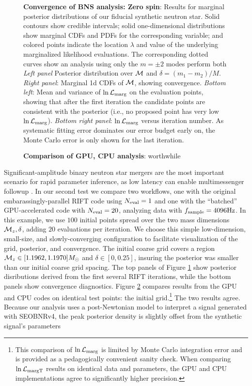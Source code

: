 \documentclass[twocolumn,prd,nofootinbib]{revtex4}
\newcommand\unit[1]{{\rm #1}}
\newcommand\editremark[1]{{\color{red} #1}}
\newcommand{\mc}{{\cal M}}
\begin{document}
\begin{figure}
\caption{\label{fig:BNS:MultiIterate}\textbf{Convergence of BNS analysis: Zero spin}: Results for marginal posterior distributions
  of our fiducial synthetic neutron star.  Solid contours show credible intervals; solid one-dimensional distributions
  show marginal CDFs and PDFs for the corresponding variable; and colored points indicate the location $\lambda$ and
  value of the underlying marginalized likelihood evaluations.   The corresponding dotted curves show an analysis using
  only the $m=\pm 2$ modes \editremark{perform both} \emph{Left panel } Posterior distribution
  over  $\mc$ and
  $\delta=(m_1-m_2)/M$.    \emph{Right panel}: Marginal 1d CDFs of $\mc$, showing convergence.
\emph{Bottom left}: Mean and variance of  $\ln{\cal L}_{\rm marg}$ on the evaluation points,  showing that after the
first iteration the
candidate points are consistent with the posterior (i.e., no proposed point has very low $\ln {\cal L}_{\rm marg}$).
\emph{Bottom right panel}: $\ln {\cal L}_{\rm marg}$ versus iteration number.  As systematic fitting error dominates our
error budget early on, the Monte Carlo error is only shown for the last iteration.
}
\end{figure}

\begin{figure}
\caption{\label{fig:BNS:Comparison}\textbf{Comparison of GPU, CPU analysis}: \editremark{worthwhile}
}
\end{figure}


Significant-amplitude  binary neutron star mergers are the most important scenario for rapid parameter inference, as low
latency can enable multimessenger followup  \cite{LIGO-O2-Catalog}.    
% 
In our second test we compare two workflows, one with the original embarassingly-parallel RIFT code using $N_{\rm
  eval}=1$ and one with the
``batched'' GPU-accelerated code with $N_{\rm eval}=20$, analyzing data with $f_{\rm sample}=4096\unit{Hz}$.    
In this example, we use $100$ initial points spread over the two mass dimensions $\mc_z,\delta$, adding $20$ evaluations per
iteration.   We
choose this simple low-dimension, small-size, and slowly-converging configuration to facilitate visualization of the grid, posterior, and convergence.     The initial coarse grid covers a region $\mc_z\in[1.1962,1.1970] M_\odot$ and $\delta \in [0,0.25]$,  insuring the posterior was smaller than our initial
coarse grid spacing.     The top  panels of Figure  \ref{fig:BNS:MultiIterate} show posterior disributions derived
from the first several RIFT iterations, while the bottom panels show convergence diagnostics.
Figure \ref{fig:BNS:Comparison} compares results from the GPU and CPU codes on \editremark{identical test points: the
  initial grid}.\footnote{This comparison of $\ln {\cal L}_{\rm marg}$ is limited by Monte Carlo integration error and
  is provided  as a pedagogically convenient sanity check.  When comparing 
  $\ln {\cal L}_{\rm margT}$ results on identical data and parameters, the GPU and CPU implementations agree to
  significantly higher precision.}  The two results agree.
Because our analysis uses a post-Newtonian model to interpret a signal generated with SEOBNRv4, the peak posterior
density is slightly  offset
 from the synthetic signal's parameters
\end{document}
